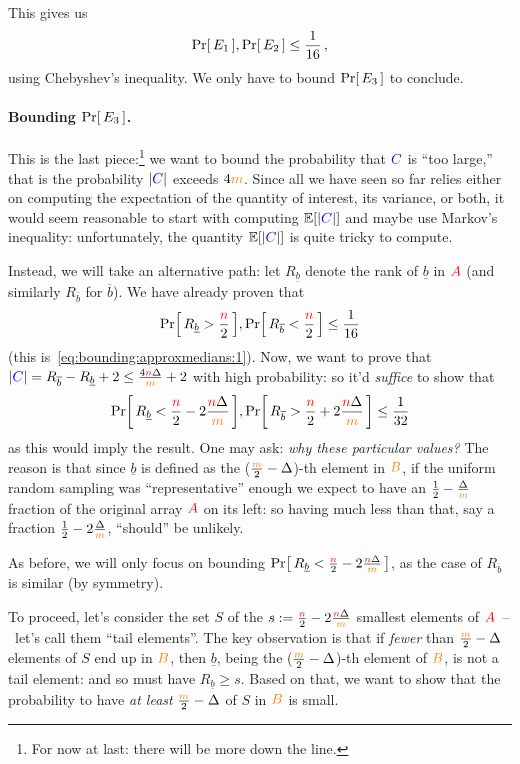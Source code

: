 This gives us
\begin{equation}
    \label{eq:bounding:approxmedians:1}
    \probaOf{E_1},\probaOf{E_2} \leq \frac{1}{16}\,,
\end{equation}
using Chebyshev's inequality. We only have to bound $\probaOf{E_3}$ to conclude.

\paragraph{Bounding $\probaOf{E_3}$.} This is the last piece:\footnote{For now at last: there will be more down the line.} we want to bound the probability that $\textcolor{blue}{C}$ is ``too large,'' that is the probability $|\textcolor{blue}{C}|$ exceeds $4\textcolor{orange}{m}$. Since all we have seen so far relies either on computing the expectation of the quantity of interest, its variance, or both, it would seem reasonable to start with computing $\expect{|\blue{C}|}$ and maybe use Markov's inequality: unfortunately,
the quantity $\expect{|\blue{C}|}$ is quite tricky to compute. 

Instead, we will take an alternative path: let $R_{\underline{b}}$ denote the rank of $\underline{b}$ in $\textcolor{red}{A}$ (and similarly $R_{\overline{b}}$ for $\overline{b}$). We have already proven that 
\[
\probaOf{ R_{\underline{b}} > \frac{\ns}{2}} , \probaOf{ R_{\overline{b}} < \frac{\ns}{2}} \leq \frac{1}{16}
\]
(this is~\cref{eq:bounding:approxmedians:1}). Now, we want to prove that $|\textcolor{blue}{C}| = R_{\overline{b}}-R_{\underline{b}} +2 \leq \frac{4{\textcolor{red}{n}}\Delta}{\textcolor{orange}{m}}+2$ with high probability: so it'd \emph{suffice} to show that 
\[
\probaOf{ R_{\underline{b}} < \frac{\ns}{2} - 2\frac{\ns\Delta}{\orange{m}}} , \probaOf{ R_{\overline{b}} > \frac{\ns}{2} + 2\frac{\ns\Delta}{\orange{m}}} \leq \frac{1}{32}
\]
as this would imply the result. One may ask: \emph{why these particular values?} The reason is that since $\underline{b}$ is defined as the ($\frac{\textcolor{orange}{m}}{2} - \Delta$)-th element in $\textcolor{orange}{B}$, if the uniform random sampling was ``representative'' enough we expect to have an $\frac{1}{2} - \frac{\Delta}{\textcolor{orange}{m}}$ fraction of the original array $\textcolor{red}{A}$ on its left: so having much less than that, say a fraction $\frac{1}{2} - 2\frac{\Delta}{\textcolor{orange}{m}}$, ``should'' be unlikely.

As before, we will only focus on bounding $\probaOf{ R_{\underline{b}} < \frac{\ns}{2} - 2\frac{\ns\Delta}{\orange{m}}}$, as the case of $R_{\overline{b}}$ is similar (by symmetry). 

To proceed, let's consider the set $S$ of the $s:= \frac{{\textcolor{red}{n}}}{2} - 2\frac{{\textcolor{red}{n}}\Delta}{\textcolor{orange}{m}}$ smallest elements of $\textcolor{red}{A}$~--~let's call them ``tail elements''. The key observation is that if \emph{fewer} than $\frac{\textcolor{orange}{m}}{2}-\Delta$ elements of $S$ end up in $\textcolor{orange}{B}$, then $\underline{b}$, being the ($\frac{\textcolor{orange}{m}}{2}-\Delta$)-th element of $\textcolor{orange}{B}$, is not a tail element: and so must have $R_{\underline{b}} \geq s$. Based on that, we want to show that the probability to have \emph{at least} $\frac{\textcolor{orange}{m}}{2}-\Delta$ of $S$ in $\textcolor{orange}{B}$ is small.

